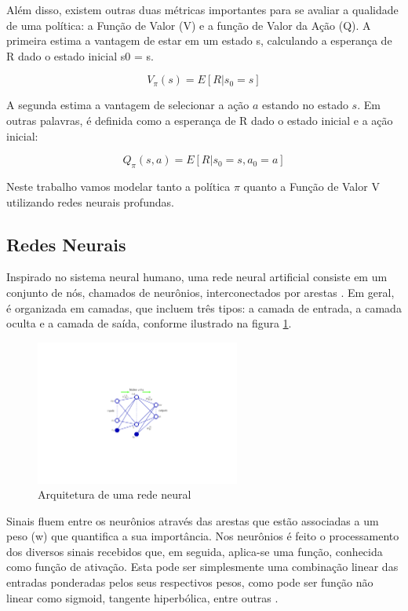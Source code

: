 Além disso, existem outras duas métricas importantes para se avaliar a qualidade de uma política: a Função de Valor (V) e a função de Valor da Ação (Q). A primeira estima a vantagem de estar em um estado s, calculando a esperança de R dado o estado inicial s0 = s. 

\begin{equation}
    V_\pi(s) = E[R|s_0 = s]
\end{equation}

A segunda estima a vantagem de selecionar a ação $a$ estando no estado $s$. Em outras palavras, é definida como a esperança de R dado o estado inicial e a ação inicial:

\begin{equation}
    Q_\pi(s,a) = E[R|s_0 = s, a_0 = a]
\end{equation}


Neste trabalho vamos modelar tanto a política $\pi$ quanto a Função de Valor V utilizando redes neurais profundas. 

\subsection{Redes Neurais}
Inspirado no sistema neural humano, uma rede neural artificial consiste em um conjunto de nós, chamados de neurônios, interconectados por arestas \cite{Bishop}. 
Em geral, é organizada em camadas, que incluem três tipos: a camada de entrada, a camada oculta e a camada de saída, conforme ilustrado na figura \ref{arqNN}.

\begin{figure}[H]
     \centering
     \includegraphics[width=0.6\textwidth]{figuras/RedeNeural.pdf}
     \caption{Arquitetura de uma rede neural \cite{Bishop}}
     \label{arqNN}
\end{figure}

Sinais fluem entre os neurônios através das arestas que estão associadas a um peso (w) que quantifica a sua importância. 
Nos neurônios é feito o processamento dos diversos sinais recebidos que, em seguida, aplica-se uma função, conhecida como função de ativação. 
Esta pode ser simplesmente uma combinação linear das entradas ponderadas pelos seus respectivos pesos, como pode ser função não linear como  sigmoid, 
tangente hiperbólica, entre outras \cite{Bishop}.   

